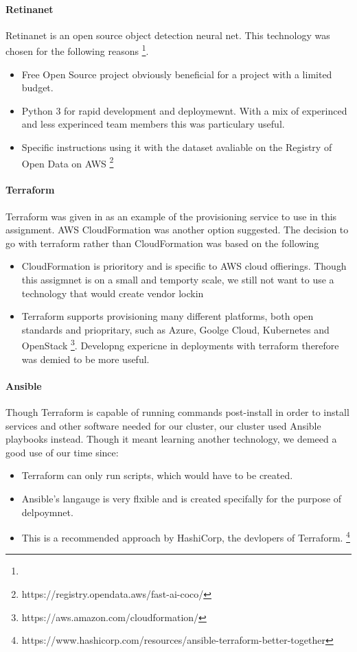\documentclass[conference]{IEEEtran}
\begin{document}
\paragraph{Retinanet}
Retinanet is an open source object detection neural net. This technology was chosen for the following reasons \footnote{}.
\begin{itemize}
\item Free Open Source project obviously beneficial for a project with a limited budget.
\item Python 3 for rapid development and deploymewnt. With a mix of experinced and less experinced team members this was particulary useful.
\item Specific instructions using it with the dataset avaliable on the Registry of Open Data on AWS \footnote{https://registry.opendata.aws/fast-ai-coco/}
\end{itemize}
\paragraph{Terraform}
Terraform was given in as an example of the provisioning service to use in this assignment. AWS CloudFormation was another option suggested. The decision to go with terraform rather than CloudFormation was based on the following
\begin{itemize}
  \item CloudFormation is prioritory and is specific to AWS cloud offierings. Though this assigmnet is on a small and temporty scale, we still not want to use a technology that would create vendor lockin
  \item Terraform supports provisioning many different platforms, both open standards and priopritary, such as Azure, Goolge Cloud, Kubernetes and OpenStack \footnote{https://aws.amazon.com/cloudformation/}. Developng expericne in deployments with terraform therefore was demied to be more useful.
\end{itemize}
\paragraph{Ansible}
Though Terraform is capable of running commands post-install in order to install services and other software needed for our cluster, our cluster used Ansible playbooks instead. Though it meant learning another technology, we demeed a good use of our time since:
\begin{itemize}
  \item Terraform can only run scripts, which would have to be created.
  \item Ansible's langauge is very flxible and is created specifally for the purpose of delpoymnet.
  \item This is a recommended approach by HashiCorp, the devlopers of Terraform. \footnote{https://www.hashicorp.com/resources/ansible-terraform-better-together}
\end{itemize}
\end{document}

